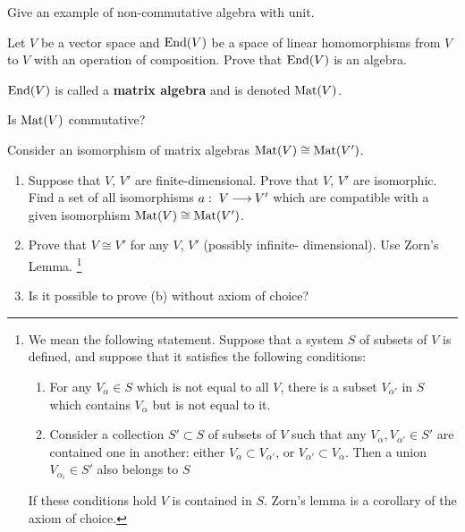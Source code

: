 \documentclass[12pt]{article}
\begin{document}
\begin{zadacha}[*]
Give an example of non-commutative algebra with unit.
\end{zadacha}

\begin{zadacha} 
Let $V$ be a vector space and $\operatorname{End}(V)$ be a space of linear
homomorphisms from $V$ to $V$ with an operation of composition. Prove
that $\operatorname{End}(V)$ is an algebra.
\end{zadacha}

\begin{opredelenie}
$\operatorname{End}(V)$ is called a {\bf matrix algebra} and is denoted $\operatorname{Mat}(V)$. 
\end{opredelenie}

\begin{zadacha}
Is $\operatorname{Mat}(V)$ commutative?
\end{zadacha}

\begin{zadacha}  Consider an isomorphism of matrix algebras
$\operatorname{Mat}(V) \cong \operatorname{Mat}(V')$. 
\begin{enumerate}
\item Suppose that $V$, $V'$ are finite-dimensional.
Prove that $V$, $V'$ are isomorphic. Find a set of all isomorphisms
 $a:\; V {\:\longrightarrow\:} V'$ which are compatible with a given isomorphism 
 $\operatorname{Mat}(V) \cong \operatorname{Mat}(V')$.

\item\sttr Prove that $V\cong V'$ for any $V$, $V'$ (possibly
  infinite- dimensional). Use Zorn's Lemma. \footnote{We mean the
    following statement. Suppose that a system $S$ of subsets of $V$
    is defined, and suppose that it satisfies the following
    conditions:
\begin{enumerate}
\item For any $V_\alpha\in S$ which is not equal to all $V$, there is
  a subset $V_{\alpha'}$ in $S$ which contains $V_\alpha$ but is not
  equal to it.

\item Consider a collection  $S'\subset S$ of subsets of 
 $V$ such that any $V_\alpha, V_{\alpha'}\in S'$ are contained one in
 another: either  $V_\alpha\subset V_{\alpha'}$, or
$V_{\alpha'}\subset V_{\alpha}$. Then a union 
 $V_{\alpha_i}\in S'$ also belongs to $S$
\end{enumerate}
If these conditions hold $V$ is contained in $S$.
Zorn's lemma is a corollary of the axiom of choice.
}

\item\doublesttr Is it possible to prove (b) without axiom of choice?
\end{enumerate}
\end{zadacha}
\end{document}
